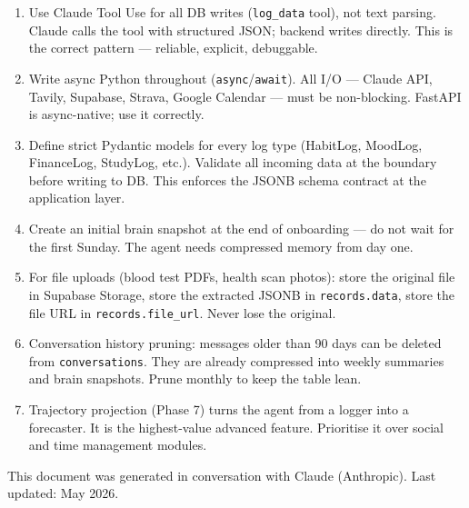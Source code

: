 \documentclass[12pt, a4paper]{article}
\begin{document}
\begin{enumerate}
    \item Use Claude Tool Use for all DB writes (\texttt{log\_data} tool), not text parsing. Claude calls the tool with structured JSON; backend writes directly. This is the correct pattern --- reliable, explicit, debuggable.
    \item Write async Python throughout (\texttt{async}/\texttt{await}). All I/O --- Claude API, Tavily, Supabase, Strava, Google Calendar --- must be non-blocking. FastAPI is async-native; use it correctly.
    \item Define strict Pydantic models for every log type (HabitLog, MoodLog, FinanceLog, StudyLog, etc.). Validate all incoming data at the boundary before writing to DB. This enforces the JSONB schema contract at the application layer.
    \item Create an initial brain snapshot at the end of onboarding --- do not wait for the first Sunday. The agent needs compressed memory from day one.
    \item For file uploads (blood test PDFs, health scan photos): store the original file in Supabase Storage, store the extracted JSONB in \texttt{records.data}, store the file URL in \texttt{records.file\_url}. Never lose the original.
    \item Conversation history pruning: messages older than 90 days can be deleted from \texttt{conversations}. They are already compressed into weekly summaries and brain snapshots. Prune monthly to keep the table lean.
    \item Trajectory projection (Phase 7) turns the agent from a logger into a forecaster. It is the highest-value advanced feature. Prioritise it over social and time management modules.
\end{enumerate}

\vfill
\begin{center}
\textcolor{midgray}{\small This document was generated in conversation with Claude (Anthropic). Last updated: May 2026.}
\end{center}
\end{document}
